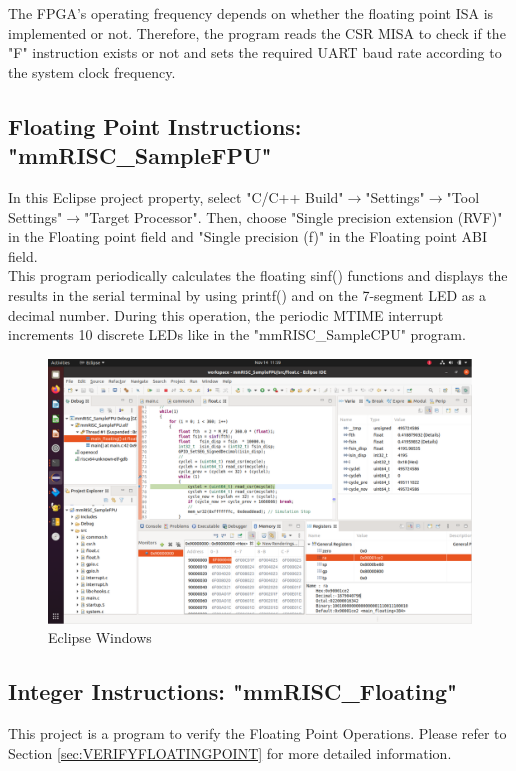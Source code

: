 The FPGA's operating frequency depends on whether the floating point ISA is implemented or not. Therefore, the program reads the CSR MISA to check if the "F" instruction exists or not and sets the required UART baud rate according to the system clock frequency.

\subsection{Floating Point Instructions: "mmRISC\_SampleFPU"}
In this Eclipse project property, select "C/C++ Build"$\rightarrow$"Settings"$\rightarrow$"Tool Settings"$\rightarrow$"Target Processor". Then, choose "Single precision extension (RVF)" in the Floating point field and "Single precision (f)" in the Floating point ABI field.\\

This program periodically calculates the floating sinf() functions and displays the results in the serial terminal by using printf() and on the 7-segment LED as a decimal number. During this operation, the periodic MTIME interrupt increments 10 discrete LEDs like in the "mmRISC\_SampleCPU" program.


\begin{figure}[H]
    \includegraphics[width=1.0\columnwidth]{./Figure/EclipseWindow.png}
    \caption{Eclipse Windows}
    \label{fig:ECLIPSEWINDOW}
\end{figure}

\subsection{Integer Instructions: "mmRISC\_Floating"}
This project is a program to verify the Floating Point Operations. Please refer to Section \ref{sec:VERIFYFLOATINGPOINT} for more detailed information.

